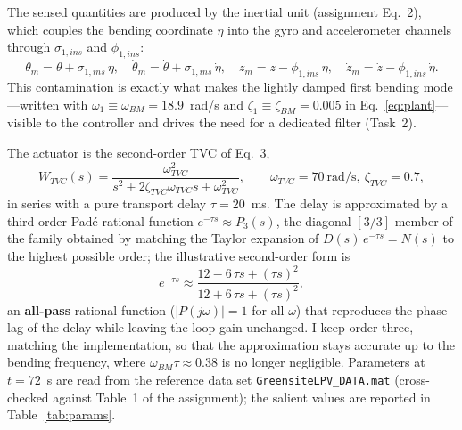 \documentclass[../main.tex]{subfiles}
\begin{document}
The sensed quantities are produced by the inertial unit (assignment Eq.~2),
which couples the bending coordinate $\eta$ into the gyro and accelerometer
channels through $\sigma_{1,ins}$ and $\phi_{1,ins}$:
\begin{equation}
\theta_m = \theta + \sigma_{1,ins}\,\eta,\quad
\dot\theta_m = \dot\theta + \sigma_{1,ins}\,\dot\eta,\quad
z_m = z - \phi_{1,ins}\,\eta,\quad
\dot z_m = \dot z - \phi_{1,ins}\,\dot\eta .
\label{eq:ins}
\end{equation}
This contamination is exactly what makes the lightly damped first bending
mode---written with $\omega_1 \equiv \omega_{BM} = 18.9$~rad/s and
$\zeta_1 \equiv \zeta_{BM} = 0.005$ in Eq.~\eqref{eq:plant}---visible to the
controller and drives the need for a dedicated filter (Task~2).

The actuator is the second-order TVC of Eq.~3,
\begin{equation}
W_{TVC}(s) = \frac{\omega_{TVC}^2}{s^2 + 2\zeta_{TVC}\omega_{TVC}s + \omega_{TVC}^2},
\qquad \omega_{TVC}=70~\text{rad/s},\ \zeta_{TVC}=0.7,
\label{eq:tvc}
\end{equation}
in series with a pure transport delay $\tau = 20$~ms. The delay is approximated
by a third-order Pad\'e rational function $e^{-\tau s} \approx P_3(s)$, the
diagonal $[3/3]$ member of the family obtained by matching the Taylor expansion
of $D(s)\,e^{-\tau s} = N(s)$ to the highest possible order; the illustrative
second-order form is
\begin{equation}
e^{-\tau s} \approx \frac{12 - 6\,\tau s + (\tau s)^2}{12 + 6\,\tau s + (\tau s)^2},
\label{eq:pade}
\end{equation}
an \textbf{all-pass} rational function ($|P(j\omega)| = 1$ for all $\omega$) that
reproduces the phase lag of the delay while leaving the loop gain unchanged.
I keep order three, matching the implementation, so that the approximation
stays accurate up to the bending frequency, where $\omega_{BM}\tau \approx 0.38$
is no longer negligible. Parameters at $t=72$~s are read from the
reference data set \texttt{GreensiteLPV\_DATA.mat} (cross-checked against
Table~1 of the assignment); the salient values are reported in
Table~\ref{tab:params}.
\end{document}
